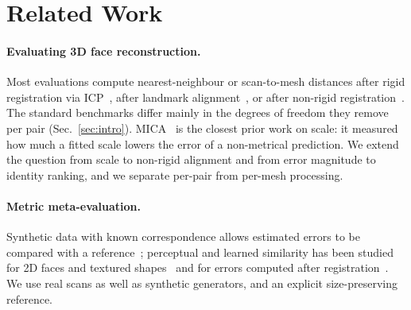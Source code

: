 \documentclass[10pt,twocolumn,letterpaper]{article}
\begin{document}
\section{Related Work}
\label{sec:related}

\paragraph{Evaluating 3D face reconstruction.} Most evaluations compute nearest-neighbour or scan-to-mesh distances after rigid registration via ICP~\cite{besl1992icp,deng2019accurate,gecer2019ganfit,genova18,prnet,feng2018evaluation,sariyanidi20}, after landmark alignment~\cite{liu2018disentangling,zhu2020beyond}, or after non-rigid registration~\cite{amberg2007nicp,ferrari2021sparse,booth20163d,gilani2017dense}. The standard benchmarks differ mainly in the degrees of freedom they remove per pair (Sec.~\ref{sec:intro}). MICA~\cite{mica} is the closest prior work on scale: it measured how much a fitted scale lowers the error of a non-metrical prediction. We extend the question from scale to non-rigid alignment and from error magnitude to identity ranking, and we separate per-pair from per-mesh processing.

\paragraph{Metric meta-evaluation.} Synthetic data with known correspondence allows estimated errors to be compared with a reference~\cite{10448898,fg2025}; perceptual and learned similarity has been studied for 2D faces and textured shapes~\cite{huang2026alignface,luan2025tge} and for errors computed after registration~\cite{shilova2026curvature}. We use real scans as well as synthetic generators, and an explicit size-preserving reference.
\end{document}
